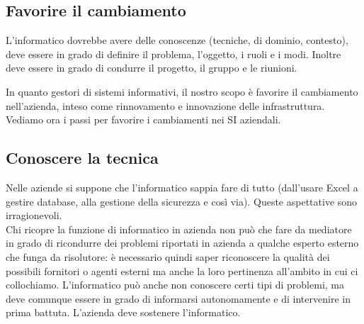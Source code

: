 \subsection{Favorire il cambiamento}

L'informatico dovrebbe avere delle conoscenze (tecniche, di dominio, contesto),
deve essere in grado di definire il problema, l'oggetto, i ruoli e i modi.
Inoltre deve essere in grado di condurre il progetto, il gruppo e le riunioni.

In quanto gestori di sistemi informativi, il nostro scopo \`e favorire il
cambiamento nell'azienda, inteso come rinnovamento e innovazione delle
infrastruttura. Vediamo ora i passi per favorire i cambiamenti nei SI aziendali.

\subsection{Conoscere la tecnica}
Nelle aziende si suppone che l'informatico sappia fare di tutto
(dall'usare Excel a gestire database, alla gestione della
sicurezza e cos\`i via). Queste aspettative sono irragionevoli. \\
Chi ricopre la funzione di informatico in azienda non pu\`o che fare da
mediatore in grado di ricondurre dei problemi riportati in azienda a qualche
esperto esterno che funga da risolutore: \`e necessario quindi saper riconoscere
la qualit\`a dei possibili fornitori o agenti esterni ma anche la loro
pertinenza all'ambito in cui ci collochiamo.
L'informatico pu\`o anche non conoscere certi tipi di problemi, ma deve comunque
essere in grado di informarsi autonomamente e di intervenire in prima battuta.
L'azienda deve sostenere l'informatico.

